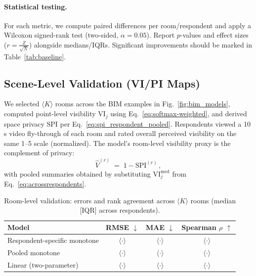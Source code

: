 \documentclass[final,3p,times,review]{elsarticle}
\begin{document}
\paragraph{Statistical testing.}
For each metric, we compute paired differences per room/respondent and apply a Wilcoxon signed-rank test (two-sided, $\alpha{=}0.05$). Report $p$-values and effect sizes ($r{=}\tfrac{Z}{\sqrt{N}}$) alongside medians/IQRs. Significant improvements should be marked in Table~\ref{tab:baseline}.

\subsection{Scene-Level Validation (VI/PI Maps)}
We selected $\langle K \rangle$ rooms across the BIM examples in Fig.~\ref{fig:bim_models}, computed point-level visibility $\mathrm{VI}_j$ using Eq.~\eqref{eq:softmax-weighted}, and derived space privacy $\mathrm{SPI}$ per Eq.~\eqref{eq:spi_respondent_pooled}. Respondents viewed a 10\,s video fly-through of each room and rated overall perceived visibility on the same 1--5 scale (normalized). The model’s room-level visibility proxy is the complement of privacy:
\begin{equation}
\widehat{V}^{(r)} \;=\; 1 - \mathrm{SPI}^{(r)} \,,
\label{eq:room-visibility-proxy}
\end{equation}
with pooled summaries obtained by substituting $\mathrm{VI}_j^{\mathrm{med}}$ from Eq.~\eqref{eq:acrossrespondents}.

\begin{table}[H]
\centering
\caption{Room-level validation: errors and rank agreement across $\langle K\rangle$ rooms (median [IQR] across respondents).}
\label{tab:room-validation}
\begin{tabular}{@{}lccc@{}}
\toprule
Model & RMSE $\downarrow$ & MAE $\downarrow$ & Spearman $\rho$ $\uparrow$ \\
\midrule
Respondent-specific monotone & $\langle \cdot \rangle$ & $\langle \cdot \rangle$ & $\langle \cdot \rangle$ \\
Pooled monotone & $\langle \cdot \rangle$ & $\langle \cdot \rangle$ & $\langle \cdot \rangle$ \\
Linear (two-parameter) & $\langle \cdot \rangle$ & $\langle \cdot \rangle$ & $\langle \cdot \rangle$ \\
\bottomrule
\end{tabular}
\end{table}
\end{document}
